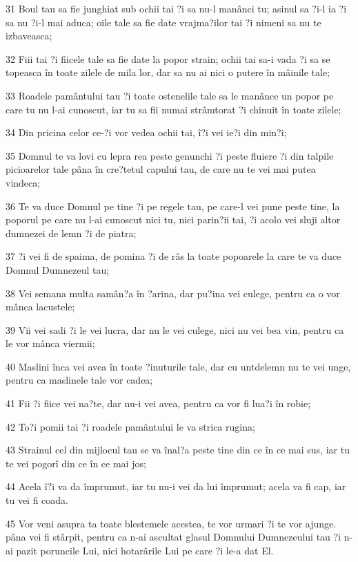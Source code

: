 \par 31 Boul tau sa fie junghiat sub ochii tai ?i sa nu-l manânci tu; asinul sa ?i-l ia ?i sa nu ?i-l mai aduca; oile tale sa fie date vrajma?ilor tai ?i nimeni sa nu te izbaveasca;
\par 32 Fiii tai ?i fiicele tale sa fie date la popor strain; ochii tai sa-i vada ?i sa se topeasca în toate zilele de mila lor, dar sa nu ai nici o putere în mâinile tale;
\par 33 Roadele pamântului tau ?i toate ostenelile tale sa le manânce un popor pe care tu nu l-ai cunoscut, iar tu sa fii numai strâmtorat ?i chinuit în toate zilele;
\par 34 Din pricina celor ce-?i vor vedea ochii tai, î?i vei ie?i din min?i;
\par 35 Domnul te va lovi cu lepra rea peste genunchi ?i peste fluiere ?i din talpile picioarelor tale pâna în cre?tetul capului tau, de care nu te vei mai putea vindeca;
\par 36 Te va duce Domnul pe tine ?i pe regele tau, pe care-l vei pune peste tine, la poporul pe care nu l-ai cunoscut nici tu, nici parin?ii tai, ?i acolo vei sluji altor dumnezei de lemn ?i de piatra;
\par 37 ?i vei fi de spaima, de pomina ?i de râs la toate popoarele la care te va duce Domnul Dumnezeul tau;
\par 38 Vei semana multa samân?a în ?arina, dar pu?ina vei culege, pentru ca o vor mânca lacustele;
\par 39 Vii vei sadi ?i le vei lucra, dar nu le vei culege, nici nu vei bea vin, pentru ca le vor mânca viermii;
\par 40 Maslini înca vei avea în toate ?inuturile tale, dar cu untdelemn nu te vei unge, pentru ca maslinele tale vor cadea;
\par 41 Fii ?i fiice vei na?te, dar nu-i vei avea, pentru ca vor fi lua?i în robie;
\par 42 To?i pomii tai ?i roadele pamântului le va strica rugina;
\par 43 Strainul cel din mijlocul tau se va înal?a peste tine din ce în ce mai sus, iar tu te vei pogorî din ce în ce mai jos;
\par 44 Acela î?i va da împrumut, iar tu nu-i vei da lui împrumut; acela va fi cap, iar tu vei fi coada.
\par 45 Vor veni asupra ta toate blestemele acestea, te vor urmari ?i te vor ajunge. pâna vei fi stârpit, pentru ca n-ai ascultat glasul Domnului Dumnezeului tau ?i n-ai pazit poruncile Lui, nici hotarârile Lui pe care ?i le-a dat El.
